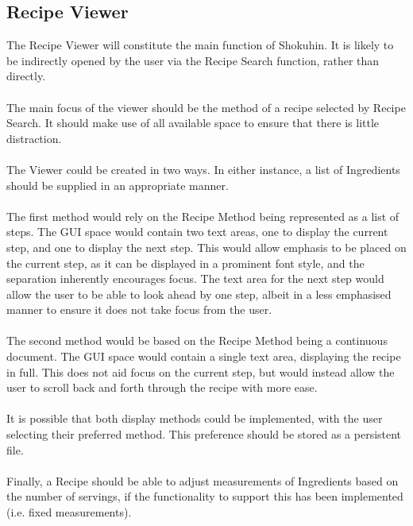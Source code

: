 \documentclass[a4paper, 12pt]{article}
\begin{document}
\subsection{Recipe Viewer}
The Recipe Viewer will constitute the main function of Shokuhin. It is likely to be indirectly opened by the user via the Recipe Search function, rather than directly.\\\\
The main focus of the viewer should be the method of a recipe selected by Recipe Search. It should make use of all available space to ensure that there is little distraction.\\\\
The Viewer could be created in two ways. In either instance, a list of Ingredients should be supplied in an appropriate manner.\\\\
The first method would rely on the Recipe Method being represented as a list of steps.
The GUI space would contain two text areas, one to display the current step, and one to display the next step. This would allow emphasis to be placed on the current step, as it can be displayed in a prominent font style, and the separation inherently encourages focus. The text area for the next step would allow the user to be able to look ahead by one step, albeit in a less emphasised manner to ensure it does not take focus from the user.\\\\
The second method would be based on the Recipe Method being a continuous document.
The GUI space would contain a single text area, displaying the recipe in full. This does not aid focus on the current step, but would instead allow the user to scroll back and forth through the recipe with more ease.
\\\\It is possible that both display methods could be implemented, with the user selecting their preferred method. This preference should be stored as a persistent file.
\\\\Finally, a Recipe should be able to adjust measurements of Ingredients based on the number of servings, if the functionality to support this has been implemented (i.e. fixed measurements).

\newpage
\end{document}
